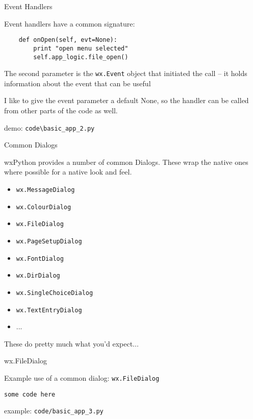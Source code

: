 \documentclass{beamer}
\begin{document}
\begin{frame}[fragile]{Event Handlers}

\vfill
{\Large Event handlers have a common signature:}

\vfill
\begin{verbatim}
    def onOpen(self, evt=None):
        print "open menu selected"
        self.app_logic.file_open()
\end{verbatim}

\vfill
{\large The second parameter is the \verb`wx.Event` object that initiated the call -- it holds information about the event that can be useful}

\vfill
{\large I like to give the event parameter a default None, so the handler can be called from other parts of the code as well.}
        
\vfill
demo: \verb`code\basic_app_2.py`

\end{frame}



\begin{frame}[fragile]{Common Dialogs}

\vfill
{\Large wxPython provides a number of common Dialogs. These wrap the native ones where possible for a native look and feel.}

\begin{itemize}
 \item \verb`wx.MessageDialog`
 \item \verb`wx.ColourDialog`
 \item \verb`wx.FileDialog`
 \item \verb`wx.PageSetupDialog`
 \item \verb`wx.FontDialog`
 \item \verb`wx.DirDialog`
 \item \verb`wx.SingleChoiceDialog`
 \item \verb`wx.TextEntryDialog`
 \item ...
\end{itemize}

\vfill
{\Large These do pretty much what you'd expect...}

\end{frame}

\begin{frame}[fragile]{wx.FileDialog}

\vfill
{\Large Example use of a common dialog: \verb`wx.FileDialog`}\\

\begin{verbatim}
some code here
\end{verbatim}

\vfill
example: \verb`code/basic_app_3.py`
\end{frame}
\end{document}
